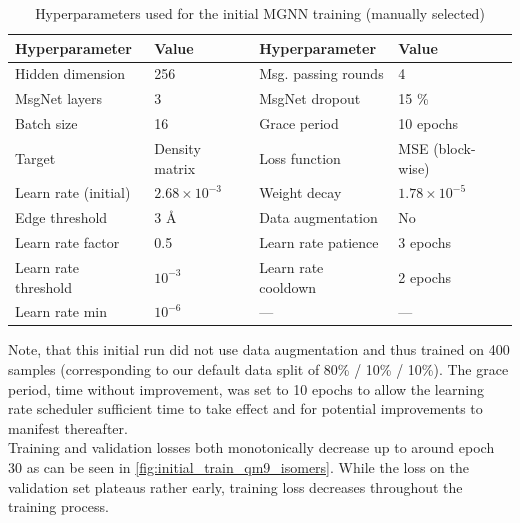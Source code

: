 \begin{table}[H]
    \centering
    \caption[Hyperparameters - initial MGNN training (manually selected)]{Hyperparameters used for the initial MGNN training (manually selected)}
    \label{tab:init_hparams}
    \begin{tabular}{ll ll}
        \toprule
        \textbf{Hyperparameter} & \textbf{Value} & \textbf{Hyperparameter} & \textbf{Value} \\
        \midrule
        Hidden dimension & 256 & Msg. passing rounds & 4 \\
        MsgNet layers & 3 & MsgNet dropout & 15 \% \\
        Batch size & 16 & Grace period & 10 epochs \\
        Target & Density matrix & Loss function & MSE (block-wise) \\
        Learn rate (initial) & $2.68 \times 10^{-3}$ & Weight decay & $1.78 \times 10^{-5}$ \\
        Edge threshold & 3 \AA & Data augmentation & No \\
        \midrule
        Learn rate factor & 0.5 & Learn rate patience & 3 epochs \\
        Learn rate threshold & $10^{-3}$ & Learn rate cooldown & 2 epochs \\
        Learn rate min & $10^{-6}$ & — & — \\
        \bottomrule
    \end{tabular}
\end{table}
Note, that this initial run did not use data augmentation and thus trained on 400 samples (corresponding to our default data split of 80\% / 10\% / 10\%). The grace period, time without improvement, was set to 10 epochs to allow the learning rate scheduler sufficient time to take effect and for potential improvements to manifest thereafter.\\
Training and validation losses both monotonically decrease up to around epoch 30 as can be seen in \autoref{fig:initial_train_qm9_isomers}. While the loss on the validation set plateaus rather early, training loss decreases throughout the training process. 

